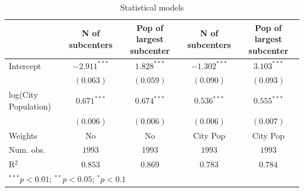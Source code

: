 
\begin{table}
\begin{center}
\begin{tabular}{l c c c c}
\hline
 & N of subcenters & Pop of largest subcenter & N of subcenters & Pop of largest subcenter \\
\hline
Intercept            & $-2.911^{***}$ & $1.828^{***}$ & $-1.302^{***}$ & $3.103^{***}$ \\
                     & $(0.063)$      & $(0.059)$     & $(0.090)$      & $(0.093)$     \\
log(City Population) & $0.671^{***}$  & $0.674^{***}$ & $0.536^{***}$  & $0.555^{***}$ \\
                     & $(0.006)$      & $(0.006)$     & $(0.006)$      & $(0.007)$     \\
\hline
Weights              & No             & No            & City Pop       & City Pop      \\
Num. obs.            & $1993$         & $1993$        & $1993$         & $1993$        \\
R$^2$                & $0.853$        & $0.869$       & $0.783$        & $0.784$       \\
\hline
\multicolumn{5}{l}{\scriptsize{$^{***}p<0.01$; $^{**}p<0.05$; $^{*}p<0.1$}}
\end{tabular}
\caption{Statistical models}
\label{table:coefficients}
\end{center}
\end{table}

